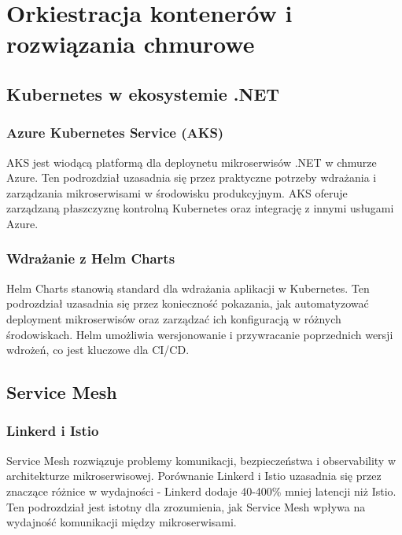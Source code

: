 \cleardoublepage

\chapter{Orkiestracja kontenerów i rozwiązania chmurowe}
\label{cha:OrkiestracjaKontenerow}

\section{Kubernetes w ekosystemie .NET}
\label{sec:Kubernetes}

\subsection{Azure Kubernetes Service (AKS)}
\label{subsec:AzureAKS}

AKS jest wiodącą platformą dla deploynetu mikroserwisów .NET w chmurze Azure. Ten podrozdział uzasadnia się przez praktyczne potrzeby wdrażania i zarządzania mikroserwisami w środowisku produkcyjnym. AKS oferuje zarządzaną płaszczyznę kontrolną Kubernetes oraz integrację z innymi usługami Azure.

\subsection{Wdrażanie z Helm Charts}
\label{subsec:HelmCharts}

Helm Charts stanowią standard dla wdrażania aplikacji w Kubernetes. Ten podrozdział uzasadnia się przez konieczność pokazania, jak automatyzować deployment mikroserwisów oraz zarządzać ich konfiguracją w różnych środowiskach. Helm umożliwia wersjonowanie i przywracanie poprzednich wersji wdrożeń, co jest kluczowe dla CI/CD.

\section{Service Mesh}
\label{sec:ServiceMesh}

\subsection{Linkerd i Istio}
\label{subsec:LinkerdIstio}

Service Mesh rozwiązuje problemy komunikacji, bezpieczeństwa i observability w architekturze mikroserwisowej. Porównanie Linkerd i Istio uzasadnia się przez znaczące różnice w wydajności - Linkerd dodaje 40-400\% mniej latencji niż Istio. Ten podrozdział jest istotny dla zrozumienia, jak Service Mesh wpływa na wydajność komunikacji między mikroserwisami.

